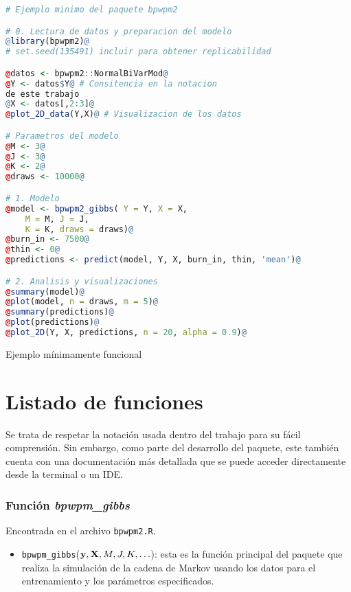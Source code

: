 \documentclass[../../Main/Main.tex]{subfiles}
\begin{document}
\begin{table}[p]
\makebox[\linewidth]{\rule{\textwidth}{0.4pt}}
\begin{lstlisting}[language = R, style = base]
	# Ejemplo minimo del paquete bpwpm2

# 0. Lectura de datos y preparacion del modelo  
@library(bpwpm2)@
# set.seed(135491) incluir para obtener replicabilidad

@datos <- bpwpm2::NormalBiVarMod@
@Y <- datos$Y@ # Consitencia en la notacion 
de este trabajo
@X <- datos[,2:3]@
@plot_2D_data(Y,X)@ # Visualizacion de los datos

# Parametros del modelo
@M <- 3@
@J <- 3@
@K <- 2@
@draws <- 10000@

# 1. Modelo
@model <- bpwpm2_gibbs(	Y = Y, X = X, 
	M = M, J = J, 
	K = K, draws = draws)@
@burn_in <- 7500@
@thin <- 0@
@predictions <- predict(model, Y, X, burn_in, thin, 'mean')@

# 2. Analisis y visualizaciones
@summary(model)@
@plot(model, n = draws, m = 5)@
@summary(predictions)@
@plot(predictions)@
@plot_2D(Y, X, predictions, n = 20, alpha = 0.9)@
\end{lstlisting}
\makebox[\linewidth]{\rule{\textwidth}{0.4pt}}
\caption{Ejemplo mínimamente funcional}
\label{tab:Codigo}
\end{table}

\section{Listado de funciones}
Se trata de respetar la notación usada dentro del trabajo para su fácil comprensión. Sin embargo, como parte del desarrollo del paquete, este también cuenta con una documentación más detallada que se puede acceder directamente desde la terminal o un IDE.

\subsubsection*{Función \textit{bpwpm\_gibbs}}
Encontrada en el archivo \verb|bpwpm2.R|.
\begin{itemize}[label={}]
	\item \verb|bpwpm_gibbs|($\mathbf{y},\mathbf{X},M,J,K,\ldots$): esta es la función principal del paquete que realiza la simulación de la cadena de Markov usando los datos para el entrenamiento y los parámetros especificados.
\end{itemize}
\end{document}
